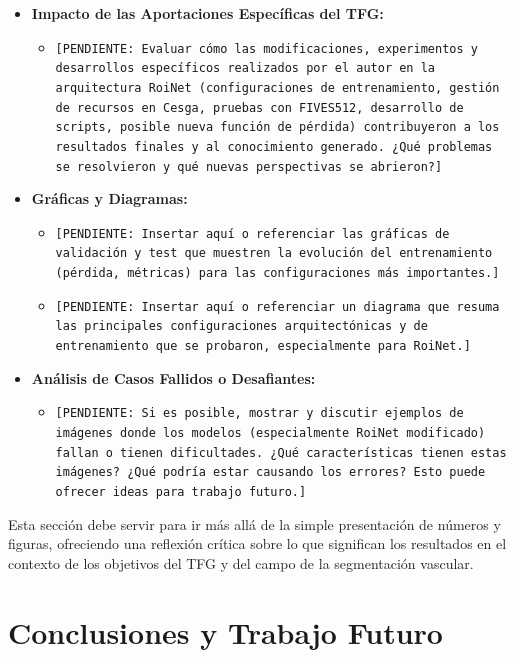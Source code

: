 \documentclass[11pt,a4paper]{report} %
\begin{document}
\begin{itemize}
\begin{itemize}
        \end{itemize}
    \item \textbf{Impacto de las Aportaciones Específicas del TFG:}
        \begin{itemize}
            \item \texttt{[PENDIENTE: Evaluar cómo las modificaciones, experimentos y desarrollos específicos realizados por el autor en la arquitectura RoiNet (configuraciones de entrenamiento, gestión de recursos en Cesga, pruebas con FIVES512, desarrollo de scripts, posible nueva función de pérdida) contribuyeron a los resultados finales y al conocimiento generado. ¿Qué problemas se resolvieron y qué nuevas perspectivas se abrieron?]}
        \end{itemize}
    \item \textbf{Gráficas y Diagramas:}
        \begin{itemize}
            \item \texttt{[PENDIENTE: Insertar aquí o referenciar las gráficas de validación y test que muestren la evolución del entrenamiento (pérdida, métricas) para las configuraciones más importantes.]}
            \item \texttt{[PENDIENTE: Insertar aquí o referenciar un diagrama que resuma las principales configuraciones arquitectónicas y de entrenamiento que se probaron, especialmente para RoiNet.]}
        \end{itemize}
    \item \textbf{Análisis de Casos Fallidos o Desafiantes:}
        \begin{itemize} 
            \item \texttt{[PENDIENTE: Si es posible, mostrar y discutir ejemplos de imágenes donde los modelos (especialmente RoiNet modificado) fallan o tienen dificultades. ¿Qué características tienen estas imágenes? ¿Qué podría estar causando los errores? Esto puede ofrecer ideas para trabajo futuro.]}
        \end{itemize}
\end{itemize}
Esta sección debe servir para ir más allá de la simple presentación de números y figuras, ofreciendo una reflexión crítica sobre lo que significan los resultados en el contexto de los objetivos del TFG y del campo de la segmentación vascular.

\chapter{Conclusiones y Trabajo Futuro}
\end{document}

